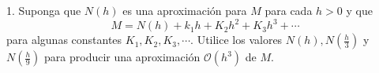 1. Suponga que $N(h)$ es una aproximación para $M$ para cada $h>0$ y que
$$
M=N(h)+k_1 h+K_2 h^2+K_3 h^3+\cdots
$$
para algunas constantes $K_1, K_2, K_3, \cdots$. Utilice los valores $N(h), N\left(\frac{h}{3}\right)$ y $N\left(\frac{h}{9}\right)$ para producir una aproximación $\mathcal{O}\left(h^3\right)$ de $M$.